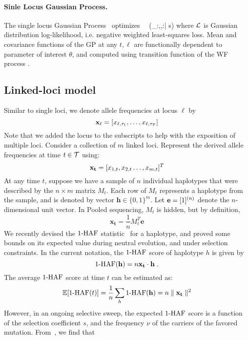 \paragraph{Sinle Locus Gaussian Process.}
The single locus Gaussian Process~\cite{XXX} optimizes
\beq
{} \ \ \Lc(\bfX_{:,\ell,:}| s)
\eeq
where ${\cal L}$ is Gaussian distribution log-likelihood, i.e. negative weighted least-squares loss. Mean and covariance functions of the GP at any $t,\ell$ are functionally dependent to parameter of interest $\theta$, and computed using transition function of the WF process \cite{EandR-GP}.

\subsection*{Linked-loci model}
Similar to single loci, we denote allele frequencies at locus $\ell$ by
\[
{\bf x_{\ell}} = [x_{\ell,\tau_1},\ldots,x_{\ell,\tau_T}]
\]
Note that we added the locus to the subscripts to help with the
exposition of multiple loci. Consider a collection of $m$ linked
loci. Represent the derived allele frequencies at time $t\in {\cal T}$
using:
\[
{\bf x_t} = [x_{1,t},x_{2,t}\ldots,x_{m,t}]^T 
\]
At any time $t$, suppose we have a sample of $n$ individual haplotypes
that were described by the $n\times m$ matrix $M_t$. Each row of $M_t$
represents a haplotype from the sample, and is denoted by vector
$\mathbf{h} \in \{0,1\}^m$. Let ${\bf e} = [1]^{(n)}$ denote the
$n$-dimensional unit vector. In Pooled sequencing, $M_t$ is hidden,
but by definition,
\[
 \mathbf{x_t} = \frac{1}{n} M_t^T\mathbf{e}
\]
We recently devised the $1\text{-HAF}$ statistic~\cite{Ronen2015} for a
haplotype, and proved some bounds on its expected value during neutral
evolution, and under selection constraints. In the current notation,
the $1\text{-HAF}$ score of haplotype $h$ is given by
\begin{equation}
1\text{-HAF}(\mathbf{h})=n\mathbf{x_t} \cdot \mathbf{h}
\;.
\label{Seq:1-HAF_SNPmatrix}
\end{equation}
The average $1\text{-HAF}$ score at time $t$ can be estimated as:
\begin{equation}
\mathbb{E}[1\text{-HAF}(t)]=\frac{1}{n}\sum_h 1\text{-HAF}(\mathbf{h}) = n\parallel \mathbf{x_t}\parallel^2
\end{equation} 
However, in an ongoing selective sweep, the expected $1\text{-HAF}$ score is
a function of the selection coefficient $s$, and the frequency $\nu$
of the carriers of the favored mutation. From~\cite{Ronen2015}, we
find that

